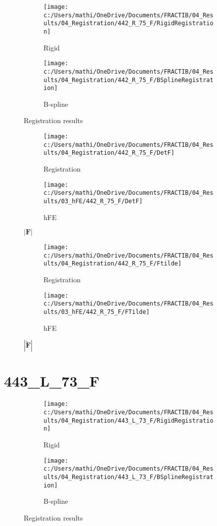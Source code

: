 \documentclass{article}%
\begin{document}
\begin{figure}[h!]%
\begin{subfigure}[b]{0.5\linewidth}%
\texttt{[image: c:/Users/mathi/OneDrive/Documents/FRACTIB/04\_Results/04\_Registration/442\_R\_75\_F/RigidRegistration]}%
\caption{Rigid}%
\end{subfigure}%
\begin{subfigure}[b]{0.5\linewidth}%
\texttt{[image: c:/Users/mathi/OneDrive/Documents/FRACTIB/04\_Results/04\_Registration/442\_R\_75\_F/BSplineRegistration]}%
\caption{B{-}spline}%
\end{subfigure}%
\caption{Registration results}%
\end{figure}

%


\begin{figure}[h!]%
\begin{subfigure}[b]{0.5\linewidth}%
\texttt{[image: c:/Users/mathi/OneDrive/Documents/FRACTIB/04\_Results/04\_Registration/442\_R\_75\_F/DetF]}%
\caption{Registration}%
\end{subfigure}%
\begin{subfigure}[b]{0.5\linewidth}%
\texttt{[image: c:/Users/mathi/OneDrive/Documents/FRACTIB/04\_Results/03\_hFE/442\_R\_75\_F/DetF]}%
\caption{hFE}%
\end{subfigure}%
\caption{$|\mathbf{F}|$}%
\end{figure}

%


\begin{figure}[h!]%
\begin{subfigure}[b]{0.5\linewidth}%
\texttt{[image: c:/Users/mathi/OneDrive/Documents/FRACTIB/04\_Results/04\_Registration/442\_R\_75\_F/Ftilde]}%
\caption{Registration}%
\end{subfigure}%
\begin{subfigure}[b]{0.5\linewidth}%
\texttt{[image: c:/Users/mathi/OneDrive/Documents/FRACTIB/04\_Results/03\_hFE/442\_R\_75\_F/FTilde]}%
\caption{hFE}%
\end{subfigure}%
\caption{$|\widetilde{\mathbf{F}}|$}%
\end{figure}

%
\newpage%
\section*{443\_L\_73\_F}%
\label{sec:443L73F}%


\begin{figure}[h!]%
\begin{subfigure}[b]{0.5\linewidth}%
\texttt{[image: c:/Users/mathi/OneDrive/Documents/FRACTIB/04\_Results/04\_Registration/443\_L\_73\_F/RigidRegistration]}%
\caption{Rigid}%
\end{subfigure}%
\begin{subfigure}[b]{0.5\linewidth}%
\texttt{[image: c:/Users/mathi/OneDrive/Documents/FRACTIB/04\_Results/04\_Registration/443\_L\_73\_F/BSplineRegistration]}%
\caption{B{-}spline}%
\end{subfigure}%
\caption{Registration results}%
\end{figure}
\end{document}
